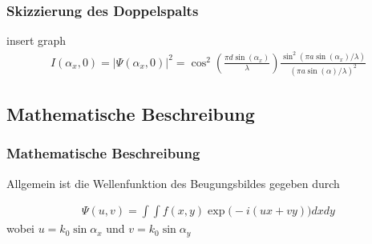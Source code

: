\documentclass{beamer}
\begin{document}

\begin{frame}
  \frametitle{Skizzierung des Doppelspalts}

insert graph\\

\begin{align*}
I(\alpha_x,0) = |\Psi(\alpha_x,0)|^2 =  \cos^2 \left(\frac{\pi d \sin(\alpha_x)}{\lambda}\right) \frac{\sin^2(\pi a \sin(\alpha_x)/\lambda)}{(\pi a \sin(\alpha)/\lambda)^2}
\end{align*}


\end{frame}



\subsection{Mathematische Beschreibung}
\begin{frame}
  \frametitle{Mathematische Beschreibung}

Allgemein ist die Wellenfunktion des Beugungsbildes gegeben durch

\begin{align*}
\Psi (u,v) = \int \int f(x,y) \exp\Big(-i(ux+vy)\Big) dx dy
\end{align*}
wobei $u= k_0 \sin\alpha_x$ und $v=k_0\sin\alpha_y$




\end{frame}


\end{document}

